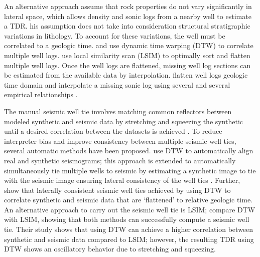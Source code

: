 An alternative approach  assume that rock properties do not vary significantly in lateral space, which allows  density and sonic logs from a nearby well to estimate a TDR.  his assumption does not take into consideration structural  stratigraphic variations in lithology. To account for these variations, the well must be correlated to a  geologic time. \cite{wheeler2014simultaneous} and \cite{wu2018incremental} use dynamic time warping (DTW) \cite[]{berndt1994using,hale2013} to correlate multiple well logs. \cite{shi2017finding} use local similarity scan (LSIM) \cite[]{fomel2007local} to optimally sort and flatten multiple well logs. Once the well logs are flattened,  missing well log sections can be estimated from the available data by  interpolation. \cite{bader2018correlation} flatten well logs  geologic time domain and interpolate a missing sonic log using several  and several empirical relationships . 

 The manual seismic well tie involves matching common reflectors between modeled synthetic and seismic data by stretching and squeezing the synthetic until a desired correlation between the datasets is achieved \cite[]{whitesimm2003}. To reduce interpreter bias and improve consistency between multiple seismic well ties, several automatic methods have been proposed. \cite{munozhale2012} use DTW to automatically align real and synthetic seismograms; this approach is extended to automatically\old{,}  simultaneously\old{,} tie multiple wells to seismic by estimating a synthetic image to tie with the seismic image ensuring lateral consistency of the well ties \cite[]{munozhale2015}. Further, \cite{wucaumon2017} show that laterally consistent seismic well ties  achieved by using DTW to correlate synthetic and seismic data that are `flattened' to relative geologic time. An alternative approach to carry out the seismic well tie is LSIM; \cite{herrerab} compare DTW with LSIM, showing that both methods can successfully compute a seismic well tie. Their study shows that using DTW can achieve a higher correlation between synthetic and seismic data compared to LSIM; however, the resulting TDR using DTW shows an  oscillatory behavior due to stretching and squeezing.

